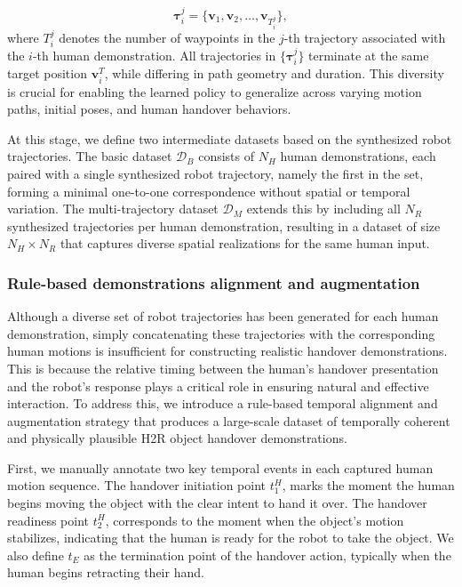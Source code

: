 \documentclass[final,5p,times,twocolumn]{elsarticle}
\begin{document}
\begin{equation}
    \boldsymbol{\tau}_{i}^{j} = \{ \mathbf{v}_1, \mathbf{v}_2, \dots, \mathbf{v}_{T_{i}^{j}} \},
\end{equation}
where $T_{i}^{j}$ denotes the number of waypoints in the $j$-th trajectory associated with the $i$-th human demonstration. All trajectories in $\{ \boldsymbol{\tau}_{i}^{j} \}$ terminate at the same target position $\mathbf{v}_i^T$, while differing in path geometry and duration. This diversity is crucial for enabling the learned policy to generalize across varying motion paths, initial poses, and human handover behaviors.

At this stage, we define two intermediate datasets based on the synthesized robot trajectories. The basic dataset $\mathcal{D}_B$ consists of $N_H$ human demonstrations, each paired with a single synthesized robot trajectory, namely the first in the set, forming a minimal one-to-one correspondence without spatial or temporal variation. The multi-trajectory dataset $\mathcal{D}_M$ extends this by including all $N_R$ synthesized trajectories per human demonstration, resulting in a dataset of size $N_H \times N_R$ that captures diverse spatial realizations for the same human input.

\subsubsection{Rule-based demonstrations alignment and augmentation}    \label{sec:3.2.3}
Although a diverse set of robot trajectories has been generated for each human demonstration, simply concatenating these trajectories with the corresponding human motions is insufficient for constructing realistic handover demonstrations. This is because the relative timing between the human's handover presentation and the robot's response plays a critical role in ensuring natural and effective interaction. To address this, we introduce a rule-based temporal alignment and augmentation strategy that produces a large-scale dataset of temporally coherent and physically plausible H2R object handover demonstrations.

First, we manually annotate two key temporal events in each captured human motion sequence. The handover initiation point $t_1^H$, marks the moment the human begins moving the object with the clear intent to hand it over. The handover readiness point $t_2^H$, corresponds to the moment when the object's motion stabilizes, indicating that the human is ready for the robot to take the object. We also define $t_E$ as the termination point of the handover action, typically when the human begins retracting their hand.
\end{document}
